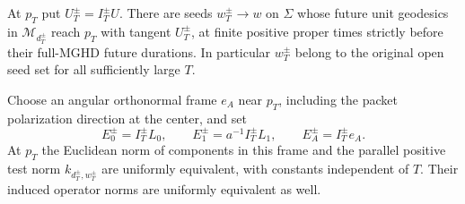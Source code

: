 \begin{proposition}
\label{attach:observer}
At $p_T$ put $U_T^\pm=I_T^\pm U$. There are seeds
$w_T^\pm\to w$ on $\Sigma$ whose future unit geodesics in
$\mathcal M_{d_T^\pm}$ reach $p_T$ with tangent $U_T^\pm$, at finite
positive proper times strictly before their full-MGHD future
durations. In particular $w_T^\pm$ belong to the original open
seed set for all sufficiently large $T$.

Choose an angular orthonormal frame $e_A$ near $p_T$, including the
packet polarization direction at the center, and set
\begin{equation}\label{attach:adapted-frame}
 E_0^\pm=I_T^\pm L_0,\qquad
 E_1^\pm=a^{-1}I_T^\pm L_1,\qquad
 E_A^\pm=I_T^\pm e_A.
\end{equation}
At $p_T$ the Euclidean norm of components in this frame and the
parallel positive test norm $k_{d_T^\pm,w_T^\pm}$ are uniformly
equivalent, with constants independent of $T$. Their induced
operator norms are uniformly equivalent as well.
\end{proposition}

